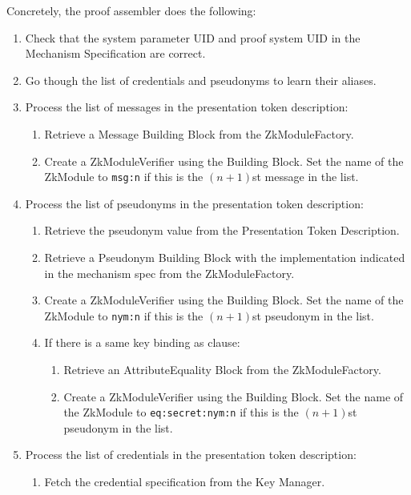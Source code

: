     Concretely, the proof assembler does the following:
    \begin{enumerate}
      \item Check that the system parameter UID and proof system UID in the Mechanism Specification are correct.
      \item Go though the list of credentials and pseudonyms to learn their aliases.
      \item Process the list of messages in the presentation token description:
        \begin{enumerate}
          \item Retrieve a Message Building Block from the ZkModuleFactory.
          \item Create a ZkModuleVerifier using the Building Block. Set the name of the ZkModule to
            \texttt{msg:n} if this is the $(n+1)$st message in the list.
        \end{enumerate}
      \item Process the list of pseudonyms in the presentation token description:
        \begin{enumerate}
          \item Retrieve the pseudonym value from the Presentation Token Description.
          \item Retrieve a Pseudonym Building Block with the implementation indicated in the mechanism spec from the ZkModuleFactory.
          \item Create a ZkModuleVerifier using the Building Block. Set the name of the ZkModule to
            \texttt{nym:n} if this is the $(n+1)$st pseudonym in the list.
          \item If there is a same key binding as clause:
            \begin{enumerate}
              \item Retrieve an AttributeEquality Block from the ZkModuleFactory.
              \item Create a ZkModuleVerifier using the Building Block. Set the name of the ZkModule to
                \texttt{eq:secret:nym:n} if this is the $(n+1)$st pseudonym in the list.
            \end{enumerate}
        \end{enumerate}
      \item Process the list of credentials in the presentation token description:
        \begin{enumerate}
          \item Fetch the credential specification from the Key Manager.

\end{enumerate}
\end{enumerate}
